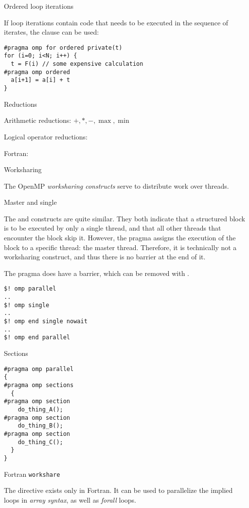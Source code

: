  {Ordered loop iterations}

If loop iterations contain code that needs to be executed in the sequence of iterates,
the  clause can be used:
\begin{verbatim}
#pragma omp for ordered private(t)
for (i=0; i<N; i++) {
  t = F(i) // some expensive calculation
#pragma omp ordered
  a[i+1] = a[i] + t
}
\end{verbatim}

 {Reductions}

Arithmetic reductions: $+,*,-,\max,\min$

Logical operator reductions: \n{&,&&,|,||,^}

Fortran: 

 {Worksharing}

The OpenMP \emph{worksharing constructs} serve to distribute work
over threads.

 {Master and single}

The  and  constructs
are quite similar. They both indicate that a structured block
is to be executed by only a single thread, and that all other threads
that encounter the block skip it. However, the  pragma
assigns the execution of the block to a specific thread: the master thread.
Therefore, it is technically not a worksharing construct, and thus
there is no barrier at the end of it.

The  pragma does have a barrier, which can be removed with
.
\begin{verbatim}
$! omp parallel
..
$! omp single
..
$! omp end single nowait
..
$! omp end parallel
\end{verbatim}

 {Sections}

\begin{verbatim}
#pragma omp parallel
{
#pragma omp sections
  {
#pragma omp section
    do_thing_A();
#pragma omp section
    do_thing_B();
#pragma omp section
    do_thing_C();
  }
}
\end{verbatim}

 {Fortran \texttt{workshare}}

The  directive exists only in Fortran.
It can be used to parallelize
the implied loops in \emph{array syntax},
as well as  \emph{forall} loops.

